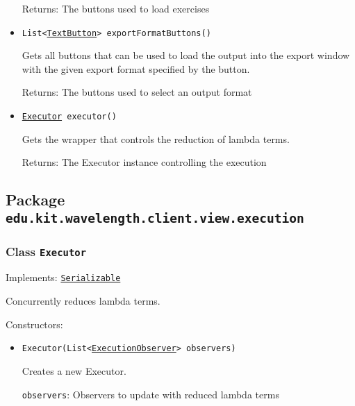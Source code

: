 \begin{itemize}
Returns: The buttons used to load exercises

\item \texttt{List<\hyperref[type:edu.kit.wavelength.client.view.webui.component.TextButton]{TextButton}> exportFormatButtons()}

Gets all buttons that can be used to load the output into the export window with the given export format specified by the button.

Returns: The buttons used to select an output format

\item \texttt{\hyperref[type:edu.kit.wavelength.client.view.execution.Executor]{Executor} executor()}

Gets the wrapper that controls the reduction of lambda terms.

Returns: The Executor instance controlling the execution

\end{itemize}

\subsection{Package \lstinline{edu.kit.wavelength.client.view.execution}}
\label{pkg:edu.kit.wavelength.client.view.execution}


\subsubsection{Class \texttt{Executor}}
\label{type:edu.kit.wavelength.client.view.execution.Executor}
Implements: \texttt{\hyperref[type:edu.kit.wavelength.client.model.serialization.Serializable]{Serializable}}

Concurrently reduces lambda terms.

Constructors:
\begin{itemize}
\item \texttt{Executor(List<\hyperref[type:edu.kit.wavelength.client.view.execution.ExecutionObserver]{ExecutionObserver}> observers)}

Creates a new Executor.

\texttt{observers}: Observers to update with reduced lambda terms

\end{itemize}

